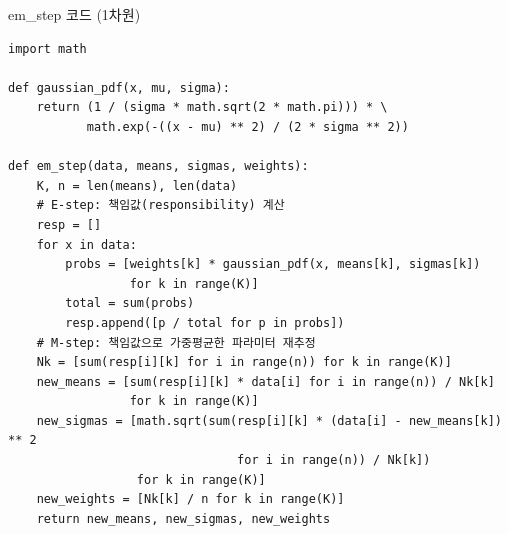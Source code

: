 \begin{frame}[fragile,shrink=15]{em\_step 코드 (1차원)}
\begin{lstlisting}
import math

def gaussian_pdf(x, mu, sigma):
    return (1 / (sigma * math.sqrt(2 * math.pi))) * \
           math.exp(-((x - mu) ** 2) / (2 * sigma ** 2))

def em_step(data, means, sigmas, weights):
    K, n = len(means), len(data)
    # E-step: 책임값(responsibility) 계산
    resp = []
    for x in data:
        probs = [weights[k] * gaussian_pdf(x, means[k], sigmas[k])
                 for k in range(K)]
        total = sum(probs)
        resp.append([p / total for p in probs])
    # M-step: 책임값으로 가중평균한 파라미터 재추정
    Nk = [sum(resp[i][k] for i in range(n)) for k in range(K)]
    new_means = [sum(resp[i][k] * data[i] for i in range(n)) / Nk[k]
                 for k in range(K)]
    new_sigmas = [math.sqrt(sum(resp[i][k] * (data[i] - new_means[k]) ** 2
                                for i in range(n)) / Nk[k])
                  for k in range(K)]
    new_weights = [Nk[k] / n for k in range(K)]
    return new_means, new_sigmas, new_weights
\end{lstlisting}
  

\end{frame}
